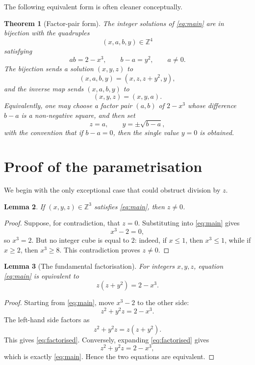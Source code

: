 \documentclass[11pt,a4paper]{amsart}
\newtheorem{theorem}{Theorem}
\newtheorem{lemma}[theorem]{Lemma}
\theoremstyle{definition}
\newcommand{\Z}{\mathbb Z}
\begin{document}
The following equivalent form is often cleaner conceptually.

\begin{theorem}[Factor-pair form]\label{thm:factorpair}
The integer solutions of \eqref{eq:main} are in bijection with the quadruples
\[
        (x,a,b,y)\in\Z^4
\]
satisfying
\begin{equation}\label{eq:factor_conditions}
        ab=2-x^3,
        \qquad b-a=y^2,
        \qquad a\ne0.
\end{equation}
The bijection sends a solution $(x,y,z)$ to
\[
        (x,a,b,y)=(x,z,z+y^2,y),
\]
and the inverse map sends $(x,a,b,y)$ to
\[
        (x,y,z)=(x,y,a).
\]
Equivalently, one may choose a factor pair $(a,b)$ of $2-x^3$ whose difference $b-a$ is a non-negative square, and then set
\[
        z=a,
        \qquad y=\pm\sqrt{b-a},
\]
with the convention that if $b-a=0$, then the single value $y=0$ is obtained.
\end{theorem}

\section{Proof of the parametrisation}

We begin with the only exceptional case that could obstruct division by $z$.

\begin{lemma}\label{lem:znonzero}
If $(x,y,z)\in\Z^3$ satisfies \eqref{eq:main}, then $z\ne0$.
\end{lemma}

\begin{proof}
Suppose, for contradiction, that $z=0$. Substituting into \eqref{eq:main} gives
\[
        x^3-2=0,
\]
so $x^3=2$. But no integer cube is equal to $2$: indeed, if $x\le1$, then $x^3\le1$, while if $x\ge2$, then $x^3\ge8$. This contradiction proves $z\ne0$.
\end{proof}

\begin{lemma}[The fundamental factorisation]\label{lem:factorisation}
For integers $x,y,z$, equation \eqref{eq:main} is equivalent to
\begin{equation}\label{eq:factorised}
        z(z+y^2)=2-x^3.
\end{equation}
\end{lemma}

\begin{proof}
Starting from \eqref{eq:main}, move $x^3-2$ to the other side:
\[
        z^2+y^2z=2-x^3.
\]
The left-hand side factors as
\[
        z^2+y^2z=z(z+y^2).
\]
This gives \eqref{eq:factorised}. Conversely, expanding \eqref{eq:factorised} gives
\[
        z^2+y^2z=2-x^3,
\]
which is exactly \eqref{eq:main}. Hence the two equations are equivalent.
\end{proof}
\end{document}
